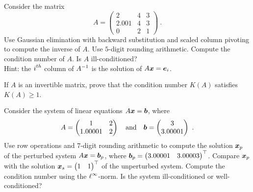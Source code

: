 \begin{question}
Consider the matrix
\[ A =\left(
\begin{array}{ccc}
2 & 4 & 3 \\
2.001 & 4 & 3 \\
0 & 2 & 1
\end{array} \right) \ .
\]
Use Gaussian elimination with backward substitution and scaled column
pivoting to compute the inverse of $A$.  Use $5$-digit rounding
arithmetic.  Compute the condition number of $A$.  Is $A$
ill-conditioned?\\
Hint: the $\displaystyle i^{th}$ column of $\displaystyle A^{-1}$
is the solution of $A\bm{x} = \bm{e}_i$.
\end{question}

\begin{question}
If $A$ is an invertible matrix, prove that the condition number 
$K(A)$ satisfies $K(A)\geq 1$.
\end{question}


\begin{question}
Consider the system of linear equations $A\bm{x} = \bm{b}$, where
\[
A = \begin{pmatrix}
1 & 2 \\
1.00001 & 2
\end{pmatrix} \quad \text{and} \quad
\bm{b} = \begin{pmatrix} 3 \\ 3.00001 \end{pmatrix} \ .
\]
Use row operations and $7$-digit rounding arithmetic to compute the
solution $\bm{x}_p$ of the perturbed system $A\bm{x} = \bm{b}_p$,
where
$\displaystyle \bm{b}_p = \begin{pmatrix} 3.00001 & 3.00003
\end{pmatrix}^\top$.
Compare $\bm{x}_p$ with the solution
$\displaystyle \bm{x}_s = \begin{pmatrix} 1 & 1 \end{pmatrix}^\top$
of the unperturbed system.  Compute the condition number using the
$\displaystyle \ell^\infty$-norm.  Is the system ill-conditioned or
well-conditioned?
\end{question}

